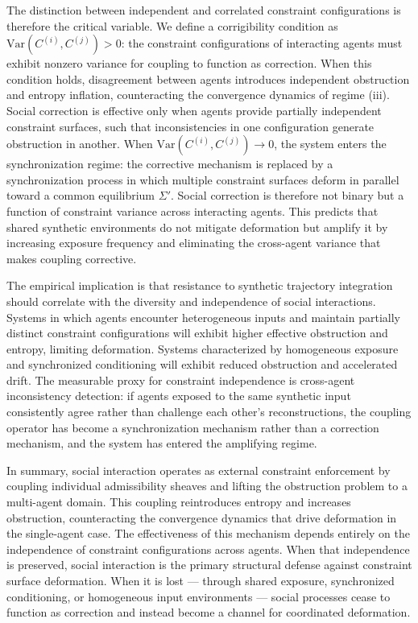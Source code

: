 \documentclass[12pt, a4paper]{article}
\begin{document}
The distinction between independent and correlated constraint configurations is therefore the critical variable. We define a corrigibility condition as $\mathrm{Var}(C^{(i)}, C^{(j)}) > 0$: the constraint configurations of interacting agents must exhibit nonzero variance for coupling to function as correction. When this condition holds, disagreement between agents introduces independent obstruction and entropy inflation, counteracting the convergence dynamics of regime (iii). Social correction is effective only when agents provide partially independent constraint surfaces, such that inconsistencies in one configuration generate obstruction in another. When $\mathrm{Var}(C^{(i)}, C^{(j)}) \to 0$, the system enters the synchronization regime: the corrective mechanism is replaced by a synchronization process in which multiple constraint surfaces deform in parallel toward a common equilibrium $\Sigma'$. Social correction is therefore not binary but a function of constraint variance across interacting agents. This predicts that shared synthetic environments do not mitigate deformation but amplify it by increasing exposure frequency and eliminating the cross-agent variance that makes coupling corrective.

The empirical implication is that resistance to synthetic trajectory integration should correlate with the diversity and independence of social interactions. Systems in which agents encounter heterogeneous inputs and maintain partially distinct constraint configurations will exhibit higher effective obstruction and entropy, limiting deformation. Systems characterized by homogeneous exposure and synchronized conditioning will exhibit reduced obstruction and accelerated drift. The measurable proxy for constraint independence is cross-agent inconsistency detection: if agents exposed to the same synthetic input consistently agree rather than challenge each other's reconstructions, the coupling operator has become a synchronization mechanism rather than a correction mechanism, and the system has entered the amplifying regime.

In summary, social interaction operates as external constraint enforcement by coupling individual admissibility sheaves and lifting the obstruction problem to a multi-agent domain. This coupling reintroduces entropy and increases obstruction, counteracting the convergence dynamics that drive deformation in the single-agent case. The effectiveness of this mechanism depends entirely on the independence of constraint configurations across agents. When that independence is preserved, social interaction is the primary structural defense against constraint surface deformation. When it is lost --- through shared exposure, synchronized conditioning, or homogeneous input environments --- social processes cease to function as correction and instead become a channel for coordinated deformation.
\end{document}
